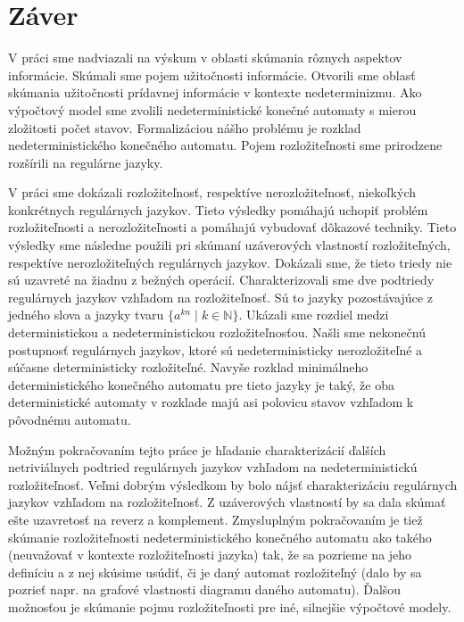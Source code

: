 \chapter*{Záver}

V práci sme nadviazali na výskum v oblasti skúmania rôznych aspektov informácie. Skúmali sme pojem užitočnosti informácie. Otvorili sme oblasť skúmania užitočnosti prídavnej informácie v kontexte nedeterminizmu. Ako výpočtový model sme zvolili nedeterministické konečné automaty s mierou zložitosti počet stavov. Formalizáciou nášho problému je rozklad nedeterministického konečného automatu. Pojem rozložiteľnosti sme prirodzene rozšírili na regulárne jazyky.
\par
V práci sme dokázali rozložiteľnosť, respektíve nerozložiteľnosť, niekoľkých konkrétnych regulárnych jazykov. Tieto výsledky pomáhajú uchopiť problém rozložiteľnosti a nerozložiteľnosti a pomáhajú vybudovať dôkazové techniky. Tieto výsledky sme následne použili pri skúmaní uzáverových vlastností rozložiteľných, respektíve nerozložiteľných regulárnych jazykov. Dokázali sme, že tieto triedy nie sú uzavreté na žiadnu z bežných operácií. Charakterizovali sme dve podtriedy regulárnych jazykov vzhľadom na rozložiteľnosť. Sú to jazyky pozostávajúce z jedného slova a jazyky tvaru $ \lbrace a^{kn} \; | \; k \in \mathbb{N} \rbrace $. Ukázali sme rozdiel medzi deterministickou a nedeterministickou rozložiteľnosťou. Našli sme nekonečnú postupnosť regulárnych jazykov, ktoré sú nedeterministicky nerozložiteľné a súčasne deterministicky rozložiteľné. Navyše rozklad minimálneho deterministického konečného automatu pre tieto jazyky je taký, že oba deterministické automaty v rozklade majú asi polovicu stavov vzhľadom k pôvodnému automatu.
\par
Možným pokračovaním tejto práce je hľadanie charakterizácií ďalších netriviálnych podtried regulárnych jazykov vzhľadom na nedeterministickú rozložiteľnosť. Veľmi dobrým výsledkom by bolo nájsť charakterizáciu regulárnych jazykov vzhľadom na rozložiteľnosť. Z uzáverových vlastností by sa dala skúmať ešte uzavretosť na reverz a komplement. Zmysluplným pokračovaním je tiež skúmanie rozložiteľnosti nedeterministického konečného automatu ako takého (neuvažovať v kontexte rozložiteľnosti jazyka) tak, že sa pozrieme na jeho definíciu a z nej skúsime usúdiť, či je daný automat rozložiteľný (dalo by sa pozrieť napr. na grafové vlastnosti diagramu daného automatu). Ďalšou možnosťou je skúmanie pojmu rozložiteľnosti pre iné, silnejšie výpočtové modely.